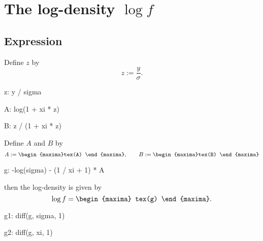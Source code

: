 


\section{The log-density $\log f$}

\subsection{Expression}

Define $z$ by
\begin{equation}
  \label{eq:defz}
  z := \frac{y}{\sigma}.
\end{equation}
\begin{maxima}%
  z: y / sigma
\end{maxima}%
\begin{maxima}%
  A: log(1 + xi * z)
\end{maxima}
\begin{maxima}%
  B: z / (1 + xi * z)
\end{maxima}%

\par\noindent
Define $A$  and $B$ by
\begin{equation}
  \label{eq:defAB}
  A := 
  \begin{maxima}%
    tex(A)
  \end{maxima},%
  \qquad
  B :=
  \begin{maxima}%
    tex(B)
  \end{maxima}%
\end{equation}
\begin{maxima}%
  g: -log(sigma) - (1 / xi + 1) * A 
\end{maxima}%
\par\noindent then the log-density is given by
\[
\log f = 
\begin{maxima}
  tex(g)
\end{maxima}.
\]
\begin{maxima}
  g1: diff(g, sigma, 1)
\end{maxima}%
\begin{maxima}
  g2: diff(g, xi, 1)
\end{maxima}%

